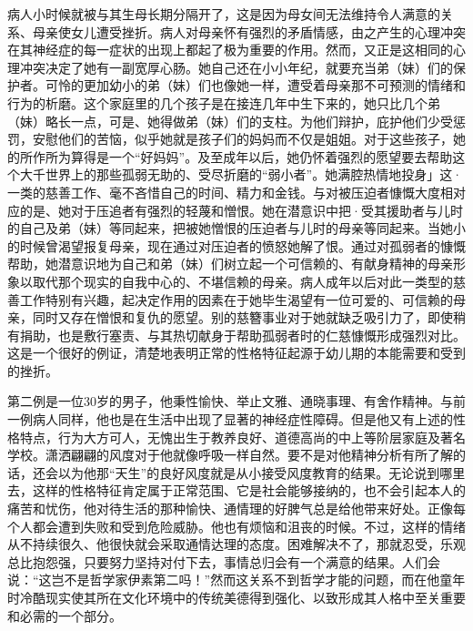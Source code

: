 \documentclass[UTF8,10pt,a4paper,openany]{book}
\begin{document}
病人小时候就被与其生母长期分隔开了，这是因为母女间无法维持令人满意的关系、母亲使女儿遭受挫折。病人对母亲怀有强烈的矛盾情感，由之产生的心理冲突在其神经症的每一症状的出现上都起了极为重要的作用。然而，又正是这相同的心理冲突决定了她有一副宽厚心肠。她自己还在小小年纪，就要充当弟（妹）们的保护者。可怜的更加幼小的弟（妹）们也像她一样，遭受着母亲那不可预测的情绪和行为的析磨。这个家庭里的几个孩子是在接连几年中生下来的，她只比几个弟（妹）略长一点，可是、她得做弟（妹）们的支柱。为他们辩护，庇护他们少受惩罚，安慰他们的苦恼，似乎她就是孩子们的妈妈而不仅是姐姐。对于这些孩子，她的所作所为算得是一个“好妈妈”。及至成年以后，她仍怀着强烈的愿望要去帮助这个大千世界上的那些孤弱无助的、受尽折磨的“弱小者”。她满腔热情地投身」这·一类的慈善工作、毫不吝惜自己的时间、精力和金钱。与对被压迫者慷慨大度相对应的是、她对于压追者有强烈的轻蔑和憎恨。她在潜意识中把·受其援助者与儿时的自己及弟（妹）等同起来，把被她憎恨的压迫者与儿时的母亲等同起来。当她小的时候曾渴望报复母亲，现在通过对压迫者的愤怒她解了恨。通过对孤弱者的慷慨帮助，她潜意识地为自己和弟（妹）们树立起一个可信赖的、有献身精神的母亲形象以取代那个现实的自我中心的、不堪信赖的母亲。病人成年以后对此一类型的慈善工作特别有兴趣，起决定作用的因素在于她毕生渴望有一位可爱的、可信赖的母亲，同时又存在憎恨和复仇的愿望。别的慈簪事业对于她就缺乏吸引力了，即使稍有捐助，也是敷行塞责、与其热切献身于帮助孤弱者时的仁慈慷慨形成强烈对比。这是一个很好的例证，清楚地表明正常的性格特征起源于幼儿期的本能需要和受到的挫折。

第二例是一位30岁的男子，他秉性愉快、举止文雅、通晓事理、有舍作精神。与前一例病人同样，他也是在生活中出现了显著的神经症性障碍。但是他又有上述的性格特点，行为大方可人，无愧出生于教养良好、道德高尚的中上等阶层家庭及著名学校。潇洒翩翩的风度对于他就像呼吸一样自然。要不是对他精神分析有所了解的话，还会以为他那“天生”的良好风度就是从小接受风度教育的结果。无论说到哪里去，这样的性格特征肯定属于正常范围、它是社会能够接纳的，也不会引起本人的痛苦和忧伤，他对待生活的那种愉快、通情理的好脾气总是给他带来好处。正像每个人都会遭到失败和受到危险威胁。他也有烦恼和沮丧的时候。不过，这样的情绪从不持续很久、他很快就会采取通情达理的态度。困难解决不了，那就忍受，乐观总比抱怨强，只要努力坚持对付下去，事情总归会有一个满意的结果。人们会说：“这岂不是哲学家伊素第二吗！”然而这关系不到哲学才能的问题，而在他童年时冷酷现实使其所在文化环境中的传统美德得到强化、以致形成其人格中至关重要和必需的一个部分。
\end{document}
